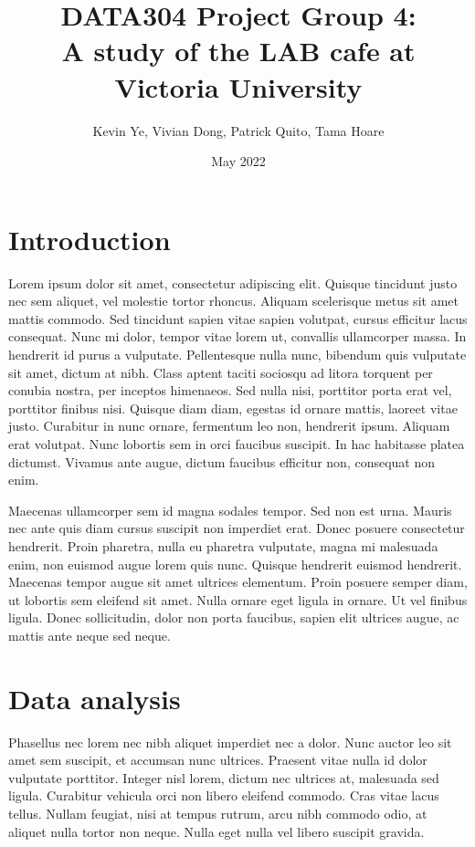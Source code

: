 \documentclass{article}
\title{\Huge DATA304 Project Group 4:\\
  \Huge A study of the LAB cafe at Victoria University}
\author{\Large Kevin Ye, Vivian Dong, Patrick Quito, Tama Hoare }
\date{\Large May 2022}
\begin{document}
\maketitle
\newpage

\section{Introduction}
Lorem ipsum dolor sit amet, consectetur adipiscing elit. Quisque tincidunt justo nec sem aliquet, vel molestie tortor rhoncus. Aliquam scelerisque metus sit amet mattis commodo. Sed tincidunt sapien vitae sapien volutpat, cursus efficitur lacus consequat. Nunc mi dolor, tempor vitae lorem ut, convallis ullamcorper massa. In hendrerit id purus a vulputate. Pellentesque nulla nunc, bibendum quis vulputate sit amet, dictum at nibh. Class aptent taciti sociosqu ad litora torquent per conubia nostra, per inceptos himenaeos. Sed nulla nisi, porttitor porta erat vel, porttitor finibus nisi. Quisque diam diam, egestas id ornare mattis, laoreet vitae justo. Curabitur in nunc ornare, fermentum leo non, hendrerit ipsum. Aliquam erat volutpat. Nunc lobortis sem in orci faucibus suscipit. In hac habitasse platea dictumst. Vivamus ante augue, dictum faucibus efficitur non, consequat non enim.

Maecenas ullamcorper sem id magna sodales tempor. Sed non est urna. Mauris nec ante quis diam cursus suscipit non imperdiet erat. Donec posuere consectetur hendrerit. Proin pharetra, nulla eu pharetra vulputate, magna mi malesuada enim, non euismod augue lorem quis nunc. Quisque hendrerit euismod hendrerit. Maecenas tempor augue sit amet ultrices elementum. Proin posuere semper diam, ut lobortis sem eleifend sit amet. Nulla ornare eget ligula in ornare. Ut vel finibus ligula. Donec sollicitudin, dolor non porta faucibus, sapien elit ultrices augue, ac mattis ante neque sed neque.

\section{Data analysis}
Phasellus nec lorem nec nibh aliquet imperdiet nec a dolor. Nunc auctor leo sit amet sem suscipit, et accumsan nunc ultrices. Praesent vitae nulla id dolor vulputate porttitor. Integer nisl lorem, dictum nec ultrices at, malesuada sed ligula. Curabitur vehicula orci non libero eleifend commodo. Cras vitae lacus tellus. Nullam feugiat, nisi at tempus rutrum, arcu nibh commodo odio, at aliquet nulla tortor non neque. Nulla eget nulla vel libero suscipit gravida.
\end{document}
